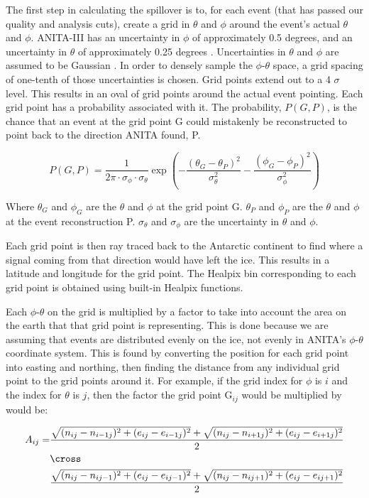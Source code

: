 The first step in calculating the spillover is to, for each event (that has passed our quality and analysis cuts), create a grid in $\theta$ and $\phi$ around the event's actual $\theta$ and $\phi$.  ANITA-III has an uncertainty in $\phi$ of approximately 0.5 degrees, and an uncertainty in $\theta$ of approximately 0.25 degrees \cite{brian}.  Uncertainties in $\theta$ and $\phi$ are assumed to be Gaussian \cite{brian}.  In order to densely sample the $\phi$-$\theta$ space, a grid spacing of one-tenth of those uncertainties is chosen.  Grid points extend out to a 4 $\sigma$ level.  This results in an oval of grid points around the actual event pointing.  Each grid point has a probability associated with it.  The probability, $P(G,P)$, is the chance that an event at the grid point G could mistakenly be reconstructed to point back to the direction ANITA found, P.  

\begin{equation}  \label{eq:spillP}
P(G,P) = \frac{1}{2\pi \cdot \sigma_{\phi} \cdot \sigma_{\theta}} \exp(-\frac{(\theta _G - \theta _P)^2}{ \sigma_{\theta}^2
} -\frac{(\phi _G - \phi _P)^2}{ \sigma_{\phi}^2})
\end{equation}

Where $\theta _G$ and $\phi _G$ are the $\theta$ and $\phi$ at the grid point G.  $\theta _P$ and $\phi _P$ are the $\theta$ and $\phi$ at the event reconstruction P.  $\sigma_{\theta}$ and $\sigma_{\phi}$ are the uncertainty in $\theta$ and $\phi$.  

Each grid point is then ray traced back to the Antarctic continent to find where a signal coming from that direction would have left the ice.  This results in a latitude and longitude for the grid point.  The Healpix bin corresponding to each grid point is obtained using built-in Healpix functions.

Each $\phi$-$\theta$ on the grid is multiplied by a factor to take into account the area on the earth that that grid point is representing.  This is done because we are assuming that events are distributed evenly on the ice, not evenly in ANITA's $\phi$-$\theta$ coordinate system. This is found by converting the position for each grid point into easting and northing, then finding the distance from any individual grid point to the grid points around it.  For example, if the grid index for $\phi$ is $i$ and the index for $\theta$ is $j$, then the factor the grid point G$_{ij}$ would be multiplied by would be:

\begin{equation} \label{eq:spillA}
\begin{split}
A_{i j} = &\frac{\sqrt{(n_{i j}-n_{i-1 j})^2+(e_{i j}-e_{i-1 j})^2} + \sqrt{(n_{i j}-n_{i+1 j})^2+(e_{i j}-e_{i+1 j})^2}}{2} \\
& \cross \\ 
&\frac{\sqrt{(n_{i j}-n_{i j-1})^2+(e_{i j}-e_{i j-1})^2} + \sqrt{(n_{i j}-n_{i j+1})^2+(e_{i j}-e_{i j+1})^2}}{2}
\end{split}
\end{equation}

